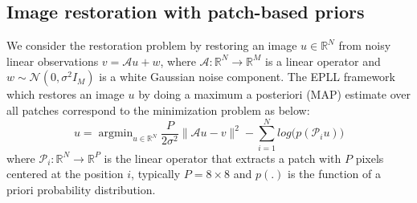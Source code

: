 \documentclass[12pt,a4paper]{article}
\DeclareMathOperator*{\argmin}{argmin}
\begin{document}
\subsection{Image restoration with patch-based priors}
We consider the restoration problem by restoring an image $u \in \mathbb{R}^N$ from noisy linear observations $v = \mathcal{A}u+w$, where $\mathcal{A} : \mathbb{R}^N \xrightarrow{} \mathbb{R}^M$ is a linear operator and $w \sim \mathcal{N}(0,\sigma^2 I_M)$ is a white Gaussian noise component.
The EPLL framework which restores an image $u$ by doing a maximum a posteriori (MAP) estimate over all patches correspond to the minimization problem as below:
\begin{equation}\label{eq:op}
    u = \argmin_{u\in \mathbb{R}^N} \frac{P}{2\sigma^2}\|\mathcal{A}u - v \|^2 - \sum_{i = 1}^ N{log(p (\mathcal{P}_i u)})
\end{equation}
where $\mathcal{P}_i : \mathbb{R}^N \xrightarrow{} \mathbb{R}^P$ is the linear operator that extracts a patch with $P$ pixels centered at the position $i$, typically $P = 8 \times 8$ and $p(.)$ is the function of a priori probability distribution.
\end{document}
